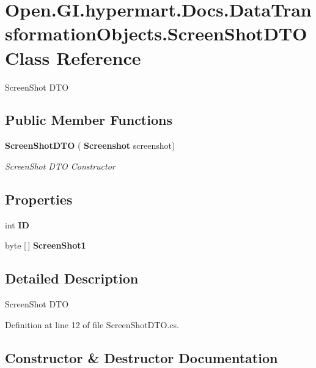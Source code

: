 \section{Open.\+G\+I.\+hypermart.\+Docs.\+Data\+Transformation\+Objects.\+Screen\+Shot\+D\+TO Class Reference}
\label{class_open_1_1_g_i_1_1hypermart_1_1_docs_1_1_data_transformation_objects_1_1_screen_shot_d_t_o}


Screen\+Shot D\+TO  


\subsection*{Public Member Functions}
\begin{DoxyCompactItemize}
\item 
\textbf{ Screen\+Shot\+D\+TO} (\textbf{ Screenshot} screenshot)
\begin{DoxyCompactList}\small\item\em Screen\+Shot D\+TO Constructor \end{DoxyCompactList}\end{DoxyCompactItemize}
\subsection*{Properties}
\begin{DoxyCompactItemize}
\item 
int \textbf{ ID}\hspace{0.3cm}{\ttfamily  [get, set]}
\item 
byte [$\,$] \textbf{ Screen\+Shot1}\hspace{0.3cm}{\ttfamily  [get, set]}
\end{DoxyCompactItemize}


\subsection{Detailed Description}
Screen\+Shot D\+TO 



Definition at line 12 of file Screen\+Shot\+D\+T\+O.\+cs.



\subsection{Constructor \& Destructor Documentation}
\mbox{\label{class_open_1_1_g_i_1_1hypermart_1_1_docs_1_1_data_transformation_objects_1_1_screen_shot_d_t_o_a1d16d059ad949737184bd5b8061d036d}} 
